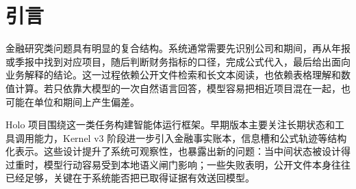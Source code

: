 \documentclass[12pt,a4paper,UTF8]{ctexart}
\begin{document}
\cover

\begin{abstract}
在金融基本面研究中，系统需要围绕公开披露文件完成证据定位和财务口径理解，并在数值计算之后给出能够追溯来源的结论。单轮大模型回答在这类任务中容易出现来源混淆，计算口径不一致和数值幻觉。为提高复杂金融问答的可靠性，本研究构建了 Holo Kernel v4，一个由宿主程序掌握执行边界并由大模型负责行动决策的单智能体运行框架。

Holo Kernel v4 由模型处理任务理解和工具选择，由宿主程序负责工具协议校验与执行记录。证据对象管理和数值核验也由宿主程序统一维护，从而使模型能够在较稳定的边界内完成多轮行动。系统采用流式工具执行机制，使模型可以沿着公开文件检索到长文档读取再到计算器核验的路径推进，并在最终回答前检查关键数值。该设计延续了 Kernel v3 在金融任务上的工程积累，同时减少了过重的语义闸门，使主循环更接近通用工具调用框架。

实验采用 FinanceBench 公开文件任务作为主要经验检验对象。开发集合 debug50 的最佳在线记录为 50/50，该结果仅作为系统调试证据。对于剩余未用于调试的 offsets 96--149，冻结配置在 gold/reference 不进入模型上下文的在线严格设置下达到 42/54，通过率为 77.78\%。该组实验的聚合缓存命中率为 89.06\%，估计总成本约为 1.44 美元。失败分析显示，当前瓶颈主要来自财务数值口径不稳定，部分最终答案没有覆盖评分所需信息，以及少数长题成本偏高。结果表明，Holo Kernel v4 已形成可审计的金融研究运行框架，也暴露了进一步提升数值稳定性和推理效率的方向。

\noindent\textbf{关键词：}金融智能体；工具调用；证据验证；FinanceBench；单智能体循环
\end{abstract}

\thispagestyle{empty}
\newpage
\tableofcontents
\newpage

\section{引言}

金融研究类问题具有明显的复合结构。系统通常需要先识别公司和期间，再从年报或季报中找到对应项目，随后判断财务指标的口径，完成公式代入，最后给出面向业务解释的结论。这一过程依赖公开文件检索和长文本阅读，也依赖表格理解和数值计算。若只依靠大模型的一次自然语言回答，模型容易把相近项目混在一起，也可能在单位和期间上产生偏差。

Holo 项目围绕这一类任务构建智能体运行框架。早期版本主要关注长期状态和工具调用能力，Kernel v3 阶段进一步引入金融事实账本，信息槽和公式轨迹等结构化表示。这些设计提升了系统可观察性，也暴露出新的问题：当中间状态被设计得过重时，模型行动容易受到本地语义闸门影响；一些失败表明，公开文件本身往往已经足够，关键在于系统能否把已取得证据有效送回模型。
\end{document}
